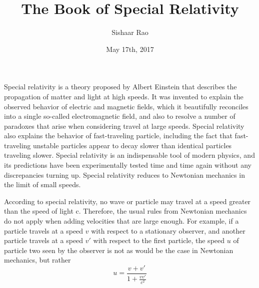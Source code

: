 \documentclass{article}
\title{The Book of Special Relativity}
\date{May 17th, 2017}
\author{Sishaar Rao}
\begin{document}
\maketitle
\newpage
{}

Special relativity is a theory proposed by Albert Einstein that describes the propagation of matter and light at high speeds. It was invented to explain the observed behavior of electric and magnetic fields, which it beautifully reconciles into a single so-called electromagnetic field, and also to resolve a number of paradoxes that arise when considering travel at large speeds. Special relativity also explains the behavior of fast-traveling particle, including the fact that fast-traveling unstable particles appear to decay slower than identical particles traveling slower. Special relativity is an indispensable tool of modern physics, and its predictions have been experimentally tested time and time again without any discrepancies turning up. Special relativity reduces to Newtonian mechanics in the limit of small speeds.

\vspace{5mm}

According to special relativity, no wave or particle may travel at a speed greater than the speed of light c. Therefore, the usual rules from Newtonian mechanics do not apply when adding velocities that are large enough. For example, if a particle travels at a speed \( v \) with respect to a stationary observer, and another particle travels at a speed \( v' \)  with respect to the first particle, the speed \( u \) of particle two seen by the observer is not  as would be the case in Newtonian mechanics, but rather
\[
    u = \frac{v + v'}{1 + \frac{vv'}{c^2}}
\]
\end{document}
